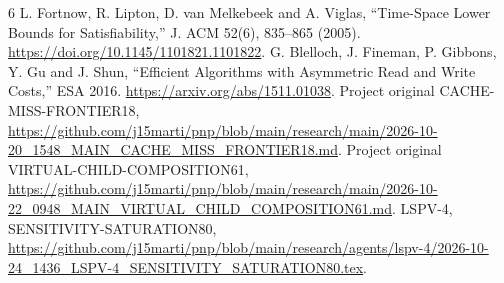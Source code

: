 \documentclass[11pt]{article}
\begin{document}
\begin{thebibliography}{6}
L. Fortnow, R. Lipton, D. van Melkebeek and A. Viglas,
``Time-Space Lower Bounds for Satisfiability,'' J. ACM 52(6), 835--865
(2005). \url{https://doi.org/10.1145/1101821.1101822}.
G. Blelloch, J. Fineman, P. Gibbons, Y. Gu and J. Shun,
``Efficient Algorithms with Asymmetric Read and Write Costs,'' ESA 2016.
\url{https://arxiv.org/abs/1511.01038}.
Project original CACHE-MISS-FRONTIER18,
\url{https://github.com/j15marti/pnp/blob/main/research/main/2026-10-20_1548_MAIN_CACHE_MISS_FRONTIER18.md}.
Project original VIRTUAL-CHILD-COMPOSITION61,
\url{https://github.com/j15marti/pnp/blob/main/research/main/2026-10-22_0948_MAIN_VIRTUAL_CHILD_COMPOSITION61.md}.
LSPV-4, SENSITIVITY-SATURATION80,
\url{https://github.com/j15marti/pnp/blob/main/research/agents/lspv-4/2026-10-24_1436_LSPV-4_SENSITIVITY_SATURATION80.tex}.
\end{thebibliography}
\end{document}
